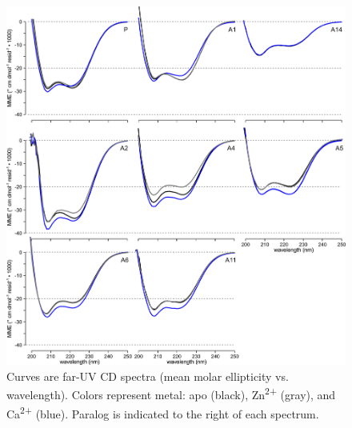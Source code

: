 \begin{figure}
\centering
	\includegraphics{ch3-S5_fig.png} 
\caption[Far UV CD spectra of S100 proteins]{Curves are far-UV CD spectra (mean molar ellipticity vs. wavelength). Colors represent metal: apo (black), Zn\textsuperscript{2+} (gray), and Ca\textsuperscript{2+} (blue). Paralog is indicated to the right of each spectrum.\label{samplefigure}}	
\end{figure}



